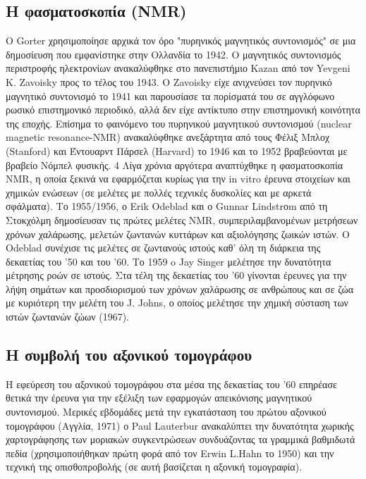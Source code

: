 \documentclass{article}
\begin{document}
\subsection{H φασματοσκοπία (NMR)}
Ο Gorter χρησιμοποίησε αρχικά τον όρο "πυρηνικός
μαγνητικός συντονισμός" σε μια δημοσίευση που εμφανίστηκε στην Ολλανδία το 1942.
Ο μαγνητικός συντονισμός περιστροφής ηλεκτρονίων ανακαλύφθηκε στο
πανεπιστήμιο Κazan από τον Yevgeni Κ. Zavoisky προς το τέλος του 1943. Ο Zavoisky είχε
ανιχνεύσει τον πυρηνικό μαγνητικό συντονισμό το 1941 και παρουσίασε τα πορίσματά του
σε αγγλόφωνο ρωσικό επιστημονικό περιοδικό, αλλά δεν είχε αντίκτυπο στην επιστημονική
κοινότητα της εποχής. Επίσημα το φαινόμενο του πυρηνικού μαγνητικού συντονισμού
(nuclear magnetic resonance-NMR) ανακαλύφθηκε ανεξάρτητα από τους Φέλιξ Μπλοχ
(Stanford) και Έντουαρντ Πάρσελ (Harvard) το 1946 και το 1952 βραβεύονται με βραβείο
Νόμπελ φυσικής.
4
Λίγα χρόνια αργότερα αναπτύχθηκε η φασματοσκοπία NMR, η οποία ξεκινά να
εφαρμόζεται κυρίως για την in vitro έρευνα στοιχείων και χημικών ενώσεων (σε μελέτες με
πολλές τεχνικές δυσκολίες και με αρκετά σφάλματα). Το 1955/1956, ο Erik Odeblad και ο
Gunnar Lindstrοm από τη Στοκχόλμη δημοσίευσαν τις πρώτες μελέτες ΝΜR,
συμπεριλαμβανομένων μετρήσεων χρόνων χαλάρωσης, μελετών ζωντανών κυττάρων και
αξιολόγησης ζωικών ιστών. Ο Odeblad συνέχισε τις μελέτες σε ζωντανούς ιστούς καθ' όλη τη
διάρκεια της δεκαετίας του '50 και του '60. Το 1959 o Jay Singer μελέτησε την δυνατότητα
μέτρησης ροών σε ιστούς. Στα τέλη της δεκαετίας του '60 γίνονται έρευνες για την λήψη
σημάτων και προσδιορισμού των χρόνων χαλάρωσης σε ανθρώπους και σε ζώα με κυριότερη
την μελέτη του J. Johns, ο οποίος μελέτησε την χημική σύσταση των ιστών ζωντανών ζώων
(1967). 
\subsection{Η συμβολή του αξονικού τομογράφου}
Η εφεύρεση του αξονικού τομογράφου στα μέσα της δεκαετίας του '60 επηρέασε
θετικά την έρευνα για την εξέλιξη των εφαρμογών απεικόνισης μαγνητικού συντονισμού.
Μερικές εβδομάδες μετά την εγκατάσταση του πρώτου αξονικού τομογράφου (Αγγλία, 1971)
ο Paul Lauterbur ανακαλύπτει την δυνατότητα χωρικής χαρτογράφησης των μοριακών
συγκεντρώσεων συνδυάζοντας τα γραμμικά βαθμιδωτά πεδία (χρησιμοποιήθηκαν πρώτη
φορά από τον Erwin L.Hahn το 1950) και την τεχνική της οπισθοπροβολής (σε αυτή
βασίζεται η αξονική τομογραφία).
\end{document}
